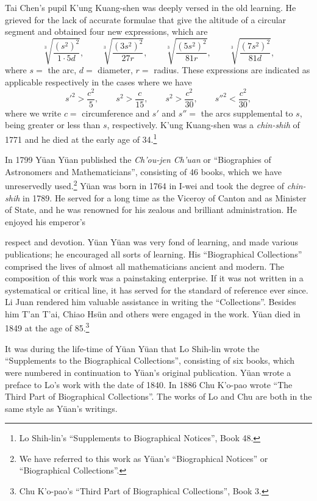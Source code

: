 \documentclass[11pt]{article}
\newcommand{\scanpage}[2]{\clearpage\setcounter{footnote}{0}\noindent{\footnotesize\color{gray}PDF page #1 · #2}\par\medskip}
\newcommand{\scanfooter}{}
\begin{document}
Tai Chen's pupil K'ung Kuang-shen was deeply versed in the old learning. He grieved for the lack of accurate formulae that give the altitude of a circular segment and obtained four new expressions, which are
\[
\sqrt[3]{\frac{(s^2)^2}{1\cdot 5d}},\qquad
\sqrt[3]{\frac{(3s^2)^2}{27r}},\qquad
\sqrt[3]{\frac{(5s^2)^2}{81r}},\qquad
\sqrt[3]{\frac{(7s^2)^2}{81d}},
\]
where $s=$ the arc, $d=$ diameter, $r=$ radius. These expressions are indicated as applicable respectively in the cases where we have
\[
{s'}^2>\frac{c^2}{5},\qquad
s^2>\frac{c}{15},\qquad
s^2>\frac{c^2}{30},\qquad
{s''}^2<\frac{c^2}{30},
\]
where we write $c=$ circumference and $s'$ and $s''=$ the arcs supplemental to $s$, being greater or less than $s$, respectively. K'ung Kuang-shen was a \emph{chin-shih} of 1771 and he died at the early age of 34.\footnote{Lo Shih-lin's ``Supplements to Biographical Notices'', Book 48.}

In 1799 Yüan Yüan published the \emph{Ch'ou-jen Ch'uan} or ``Biographies of Astronomers and Mathematicians'', consisting of 46 books, which we have unreservedly used.\footnote{We have referred to this work as Yüan's ``Biographical Notices'' or ``Biographical Collections''.} Yüan was born in 1764 in I-wei and took the degree of \emph{chin-shih} in 1789. He served for a long time as the Viceroy of Canton and as Minister of State, and he was renowned for his zealous and brilliant administration. He enjoyed his emperor's
\scanfooter

\scanpage{0138}{Chapter 18, printed page 124}
respect and devotion. Yüan Yüan was very fond of learning, and made various publications; he encouraged all sorts of learning. His ``Biographical Collections'' comprised the lives of almost all mathematicians ancient and modern. The composition of this work was a painstaking enterprise. If it was not written in a systematical or critical line, it has served for the standard of reference ever since. Li Juan rendered him valuable assistance in writing the ``Collections''. Besides him T'an T'ai, Chiao Hsün and others were engaged in the work. Yüan died in 1849 at the age of 85.\footnote{Chu K'o-pao's ``Third Part of Biographical Collections'', Book 3.}

It was during the life-time of Yüan Yüan that Lo Shih-lin wrote the ``Supplements to the Biographical Collections'', consisting of six books, which were numbered in continuation to Yüan's original publication. Yüan wrote a preface to Lo's work with the date of 1840. In 1886 Chu K'o-pao wrote ``The Third Part of Biographical Collections''. The works of Lo and Chu are both in the same style as Yüan's writings.
\end{document}
